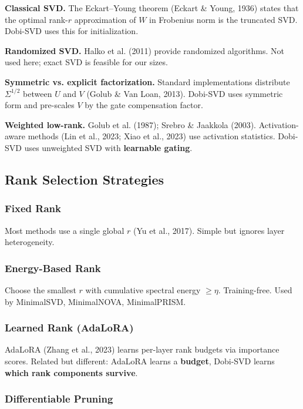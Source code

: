 \textbf{Classical SVD.} The Eckart--Young theorem (Eckart \& Young, 1936) states 
that the optimal rank-$r$ approximation of $W$ in Frobenius norm is the 
truncated SVD. Dobi-SVD uses this for initialization.

\textbf{Randomized SVD.} Halko et al. (2011) provide randomized algorithms. Not 
used here; exact SVD is feasible for our sizes.

\textbf{Symmetric vs. explicit factorization.} Standard implementations distribute 
$\Sigma^{1/2}$ between $U$ and $V$ (Golub \& Van Loan, 2013). Dobi-SVD 
uses symmetric form and pre-scales $V$ by the gate compensation factor.

\textbf{Weighted low-rank.} Golub et al. (1987); Srebro \& Jaakkola (2003). 
Activation-aware methods (Lin et al., 2023; Xiao et al., 2023) use 
activation statistics. Dobi-SVD uses unweighted SVD with \textbf{learnable gating}.

\subsection{Rank Selection Strategies}

\subsubsection{Fixed Rank}

Most methods use a single global $r$ (Yu et al., 2017). Simple but ignores 
layer heterogeneity.

\subsubsection{Energy-Based Rank}

Choose the smallest $r$ with cumulative spectral energy $\geq \eta$. 
Training-free. Used by MinimalSVD, MinimalNOVA, MinimalPRISM.

\subsubsection{Learned Rank (AdaLoRA)}

AdaLoRA (Zhang et al., 2023) learns per-layer rank budgets via 
importance scores. Related but different: AdaLoRA learns a \textbf{budget}, 
Dobi-SVD learns \textbf{which rank components survive}.

\subsubsection{Differentiable Pruning}


